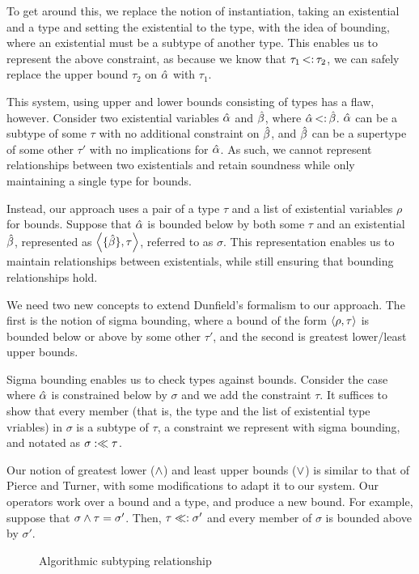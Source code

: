 \documentclass{sig-alternate}
\begin{document}
To get around this, we replace the notion of instantiation, taking an existential and a type and setting the existential to the type, with the idea of bounding, where an existential must be a subtype of another type. This enables us to represent the above constraint, as because we know that $\tau_1 \st \tau_2$, we can safely replace the upper bound $\tau_2$ on $\hat{\alpha}$ with $\tau_1$. 

This system, using upper and lower bounds consisting of types has a flaw, however. Consider two existential variables $\hat{\alpha}$ and $\hat{\beta}$, where $\alphahat \st \betahat$. $\hat{\alpha}$ can be a subtype of some $\tau$ with no additional constraint on $\hat{\beta}$, and $\hat{\beta}$ can be a supertype of some other $\tau'$ with no implications for $\hat{\alpha}$. As such, we cannot represent relationships between two existentials and retain soundness while only maintaining a single type for bounds.

Instead, our approach uses a pair of a type $\tau$ and a list of existential variables $\rho$ for bounds. Suppose that $\hat{\alpha}$ is bounded below by both some $\tau$ and an existential $\hat{\beta}$, represented as $\left<\{\hat{\beta}\},\tau\right>$, referred to as $\sigma$. This representation enables us to maintain relationships between existentials, while still ensuring that bounding relationships hold.

We need two new concepts to extend Dunfield's formalism to our approach. The first is the notion of sigma bounding, where a bound of the form $\left<\rho,\tau\right>$ is bounded below or above by some other $\tau'$, and the second is greatest lower/least upper bounds.

Sigma bounding enables us to check types against bounds. Consider the case where $\hat{\alpha}$ is constrained below by $\sigma$ and we add the constraint $\tau$. It suffices to show that every member (that is, the type and the list of existential type vriables) in $\sigma$ is a subtype of $\tau$, a constraint we represent with sigma bounding, and notated as $\sigma :\ll \tau$.

Our notion of greatest lower ($\wedge$) and least upper bounds ($\vee$) is similar to that of Pierce and Turner, with some modifications to adapt it to our system. Our operators work over a bound and a type, and produce a new bound. For example, suppose that $\sigma \wedge \tau = \sigma'$. Then, $\tau \ll: \sigma'$ and every member of $\sigma$ is bounded above by $\sigma'$.
\begin{figure}

\small

\caption{Algorithmic subtyping relationship}
\end{figure}
\end{document}
